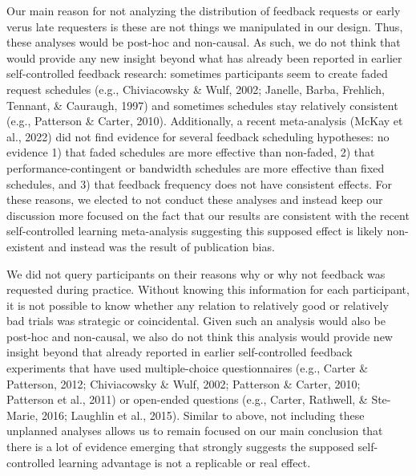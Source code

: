 \documentclass[final]{article}
\newcommand{\TaskEstimationBox}[2]{%
\ifoptiondraft{\parbox{1.0\linewidth}{\hfill \hfill {\colorbox{#2}{\color{White} \textbf{#1}}}}}%
{}%
}
\def\Done {\TaskEstimationBox{Done}{Blue}}
\begin{document}
\Done


Our main reason for not analyzing the distribution of feedback requests or early verus late requesters is these are not things we manipulated in our design. Thus, these analyses would be post-hoc and non-causal. As such, we do not think that would provide any new insight beyond what has already been reported in earlier self-controlled feedback research: sometimes participants seem to create faded request schedules (e.g., Chiviacowsky \& Wulf, 2002; Janelle, Barba, Frehlich, Tennant, \& Cauraugh, 1997) and sometimes schedules stay relatively consistent (e.g., Patterson \& Carter, 2010). Additionally, a recent meta-analysis (McKay et al., 2022) did not find evidence for several feedback scheduling hypotheses: no evidence 1) that faded schedules are more effective than non-faded, 2) that performance-contingent or bandwidth schedules are more effective than fixed schedules, and 3) that feedback frequency does not have consistent effects. For these reasons, we elected to not conduct these analyses and instead keep our discussion more focused on the fact that our results are consistent with the recent self-controlled learning meta-analysis suggesting this supposed effect is likely non-existent and instead was the result of publication bias.

\Done


We did not query participants on their reasons why or why not feedback was requested during practice. Without knowing this information for each participant, it is not possible to know whether any relation to relatively good or relatively bad trials was strategic or coincidental. Given such an analysis would also be post-hoc and non-causal, we also do not think this analysis would provide new insight beyond that already reported in earlier self-controlled feedback experiments that have used multiple-choice questionnaires (e.g., Carter \& Patterson, 2012; Chiviacowsky \& Wulf, 2002; Patterson \& Carter, 2010; Patterson et al., 2011) or open-ended questions (e.g., Carter, Rathwell, \& Ste-Marie, 2016; Laughlin et al., 2015). Similar to above, not including these unplanned analyses allows us to remain focused on our main conclusion that there is a lot of evidence emerging that strongly suggests the supposed self-controlled learning advantage is not a replicable or real effect.
\end{document}

